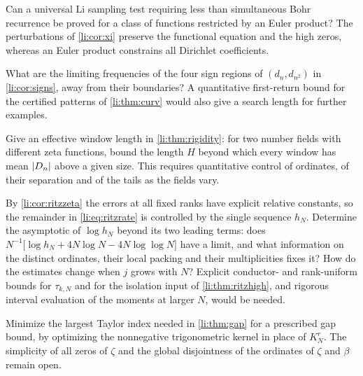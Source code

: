 \begin{question}\label{li:q:euler}
Can a universal Li sampling test requiring less than simultaneous Bohr recurrence be proved for a
class of functions restricted by an Euler product? The perturbations of \cref{li:cor:xi} preserve
the functional equation and the high zeros, whereas an Euler product constrains all Dirichlet
coefficients.
\end{question}

\begin{question}\label{li:q:signs}
What are the limiting frequencies of the four sign regions of $(d_n,d_{n^2})$ in
\cref{li:cor:signs}, away from their boundaries? A quantitative first-return bound for the certified
patterns of \cref{li:thm:curv} would also give a search length for further examples.
\end{question}

\begin{question}\label{li:q:rigidity}
Give an effective window length in \cref{li:thm:rigidity}: for two number fields with different zeta
functions, bound the length $H$ beyond which every window has mean $\lvert D_n\rvert$ above a given size.
This requires quantitative control of ordinates, of their separation and of the tails as the fields
vary.
\end{question}

\begin{question}\label{li:q:ritz}
By \cref{li:cor:ritzzeta} the errors at all fixed ranks have explicit relative constants, so the
remainder in \eqref{li:eq:ritzrate} is controlled by the single sequence $h_N$. Determine the
asymptotic of $\log h_N$ beyond its two leading terms: does
$N^{-1}\bigl[\log h_N+4N\log N-4N\log\log N\bigr]$ have a limit, and what information on the distinct
ordinates, their local packing and their multiplicities fixes it? How do the estimates change when
$j$ grows with $N$? Explicit conductor- and rank-uniform bounds for $\tau_{k,N}$ and for the isolation
input of \cref{li:thm:ritzhigh}, and rigorous interval evaluation of the moments at larger $N$, would
be needed.
\end{question}

\begin{question}\label{li:q:economy}
Minimize the largest Taylor index needed in \cref{li:thm:gap} for a prescribed gap bound, by
optimizing the nonnegative trigonometric kernel in place of $K_N^r$. The simplicity of all zeros of
$\zeta$ and the global disjointness of the ordinates of $\zeta$ and $\beta$ remain open.
\end{question}


